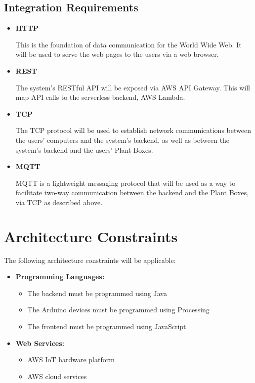 \documentclass{article}
\begin{document}
\subsection{Integration Requirements}
\begin{itemize}
	\item \textbf{HTTP}
	
	This is the foundation of data communication for the World Wide Web. It will be used to serve the web pages to the users via a web browser.	
	\item \textbf{REST}
	
	The system's RESTful API will be exposed via AWS API Gateway. This will map API calls to the serverless backend, AWS Lambda.
	\item \textbf{TCP}
	
	The TCP protocol will be used to establish network communications between the users' computers and the system's backend, as well as between the system's backend and the users' Plant Boxes.
	\item \textbf{MQTT}
	
	MQTT is a lightweight messaging protocol that will be used as a way to facilitate two-way communication between the backend and the Plant Boxes, via TCP as described above.  
	
\end{itemize}

\section{Architecture Constraints}
	The following architecture constraints will be applicable:
		\begin{itemize}
			\item \textbf{Programming Languages:}
			\begin{itemize}
				\item The backend must be programmed using Java
				\item The Arduino devices must be programmed using Processing
				\item The frontend must be programmed using JavaScript
			\end{itemize}
			\item \textbf{Web Services:}
			\begin{itemize}
				\item AWS IoT hardware platform
				\item AWS cloud services
			\end{itemize}
		\end{itemize}
\end{document}
